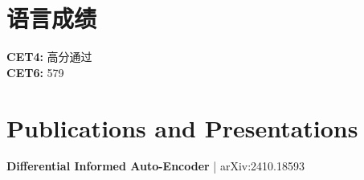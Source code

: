 \documentclass[a4paper,10pt]{article}
\begin{document}
\section*{语言成绩}
\textbf{CET4:} 高分通过 \\
\textbf{CET6:} 579


\section*{Publications and Presentations}
\textbf{Differential Informed Auto-Encoder} | arXiv:2410.18593  \\



\printbibliography
\end{document}
